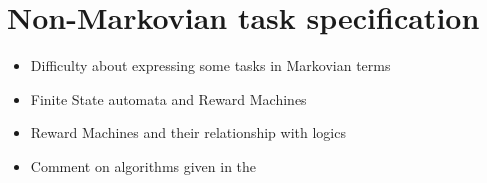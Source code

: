 \section{Non-Markovian task specification}
\label{section:non_markovian}
 {\color{blue}
 
 \begin{itemize}
 \item Difficulty about expressing some tasks in Markovian terms 
 \item Finite State automata and Reward Machines 
 \item Reward Machines and their relationship with logics
 \item Comment on algorithms given in the 
  
\end{itemize}
 
 }


